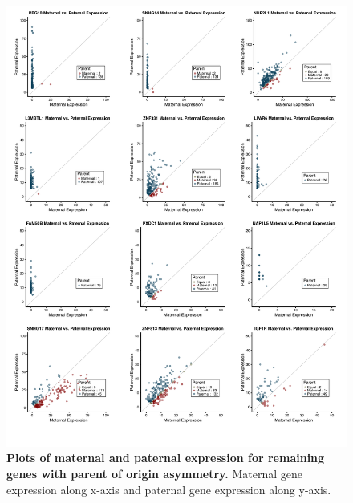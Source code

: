\begin{figure}[!htb]
\centering \includegraphics[width=5in]{img/ch03/fig-s1.pdf}
\caption[Plots of maternal and paternal expression for remaining genes with parent of origin asymmetry.]{\textbf{Plots of maternal and paternal expression for remaining genes with parent of origin asymmetry.} Maternal gene expression along x-axis and paternal gene expression along y-axis.}
\label{fig:matpatgexp}
\end{figure}





